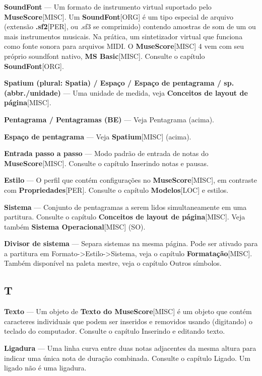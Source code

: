 \documentclass[a4paper,12pt]{article}
\begin{document}
\textbf{SoundFont} --- Um formato de instrumento virtual suportado pelo \textbf{MuseScore}\textsc{[MISC]}. Um \textbf{SoundFont}\textsc{[ORG]} é um tipo especial de arquivo (extensão \textbf{.sf2}\textsc{[PER]}, ou .sf3 se comprimido) contendo amostras de som de um ou mais instrumentos musicais. Na prática, um sintetizador virtual que funciona como fonte sonora para arquivos MIDI. O \textbf{MuseScore}\textsc{[MISC]} 4 vem com seu próprio soundfont nativo, \textbf{MS Basic}\textsc{[MISC]}. Consulte o capítulo \textbf{SoundFont}\textsc{[ORG]}.

\textbf{Spatium (plural: Spatia) / Espaço / Espaço de pentagrama / sp. (abbr./unidade)} --- Uma unidade de medida, veja \textbf{Conceitos de layout de página}\textsc{[MISC]}.

\textbf{Pentagrama / Pentagramas (BE)} --- Veja Pentagrama (acima).

\textbf{Espaço de pentagrama} --- Veja \textbf{Spatium}\textsc{[MISC]} (acima).

\textbf{Entrada passo a passo} --- Modo padrão de entrada de notas do \textbf{MuseScore}\textsc{[MISC]}. Consulte o capítulo Inserindo notas e pausas.

\textbf{Estilo} --- O perfil que contém configurações no \textbf{MuseScore}\textsc{[MISC]}, em contraste com \textbf{Propriedades}\textsc{[PER]}. Consulte o capítulo \textbf{Modelos}\textsc{[LOC]} e estilos.

\textbf{Sistema} --- Conjunto de pentagramas a serem lidos simultaneamente em uma partitura. Consulte o capítulo \textbf{Conceitos de layout de página}\textsc{[MISC]}. Veja também \textbf{Sistema Operacional}\textsc{[MISC]} (SO).

\textbf{Divisor de sistema} --- Separa sistemas na mesma página. Pode ser ativado para a partitura em Formato->Estilo->Sistema, veja o capítulo \textbf{Formatação}\textsc{[MISC]}. Também disponível na paleta mestre, veja o capítulo Outros símbolos.

\subsection*{T}
\textbf{Texto} --- Um objeto de \textbf{Texto do MuseScore}\textsc{[MISC]} é um objeto que contém caracteres individuais que podem ser inseridos e removidos usando (digitando) o teclado do computador. Consulte o capítulo Inserindo e editando texto.

\textbf{Ligadura} --- Uma linha curva entre duas notas adjacentes da mesma altura para indicar uma única nota de duração combinada. Consulte o capítulo Ligado. Um ligado não é uma ligadura.
\end{document}
